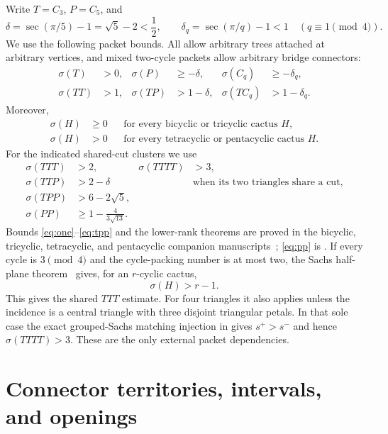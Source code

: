 \documentclass[11pt]{article}
\newcommand{\sig}{\sigma}
\begin{document}
Write $T=C_3$, $P=C_5$, and
\[
 \delta=\sec(\pi/5)-1=\sqrt5-2<\frac12,
 \qquad \delta_q=\sec(\pi/q)-1<1\quad(q\equiv1\pmod4).
\]
We use the following packet bounds.  All allow arbitrary trees attached at
arbitrary vertices, and mixed two-cycle packets allow arbitrary bridge
connectors:
\begin{align}
 \sig(T)&>0,&\sig(P)&\geq-\delta,&
 \sig(C_q)&\geq-\delta_q,\label{eq:one}\\
 \sig(TT)&>1,&\sig(TP)&>1-\delta,&
 \sig(TC_q)&>1-\delta_q.\label{eq:two}
\end{align}
Moreover,
\begin{align}
 \sig(H)&\geq0 &&\text{for every bicyclic or tricyclic cactus }H,
 \label{eq:small}\\
 \sig(H)&>0 &&\text{for every tetracyclic or pentacyclic cactus }H.
 \label{eq:lower-rank}
\end{align}
For the indicated shared-cut clusters we use
\begin{align}
 \sig(TTT)&>2,&\sig(TTTT)&>3,\label{eq:tri-clusters}\\
 \sig(TTP)&>2-\delta
 &&\text{when its two triangles share a cut},\label{eq:ttp}\\
 \sig(TPP)&>6-2\sqrt5,\label{eq:tpp}\\
 \sig(PP)&\geq1-\frac4{3\sqrt{13}}.\label{eq:pp}
\end{align}
Bounds \eqref{eq:one}--\eqref{eq:tpp} and the lower-rank theorems are proved
in the bicyclic, tricyclic, tetracyclic, and pentacyclic companion
manuscripts~\cite{Bicyclic,Tricyclic,Tetracyclic,Pentacyclic};
\eqref{eq:pp} is \cite[Theorem~5.1]{Bicyclic}.
If every cycle is $3\pmod4$ and the cycle-packing number is at most two, the
Sachs half-plane theorem~\cite{PackingTwo} gives, for an $r$-cyclic cactus,
\begin{equation}\label{eq:favorable}
 \sig(H)>r-1.
\end{equation}
This gives the shared $TTT$ estimate.  For four triangles it also applies
unless the incidence is a central triangle with three disjoint triangular
petals.  In that sole case the exact grouped-Sachs matching injection in
\cite[Proposition~4.11]{PackingTwo} gives $s^+>s^-$ and hence
$\sig(TTTT)>3$.  These are the only external packet dependencies.

\section{Connector territories, intervals, and openings}
\end{document}
